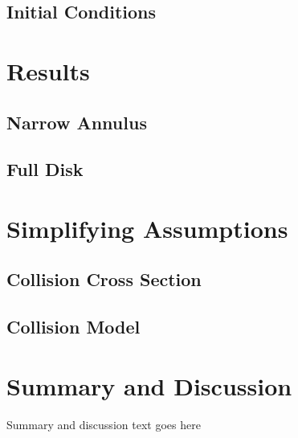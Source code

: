 \documentclass[onecolumn]{aastex63}
\begin{document}
\subsection{Initial Conditions}

\section{Results}

\subsection{Narrow Annulus}

\subsection{Full Disk}

\section{Simplifying Assumptions}

\subsection{Collision Cross Section}

\subsection{Collision Model}

\section{Summary and Discussion} \label{sec:discuss}

Summary and discussion text goes here



\clearpage
\end{document}
